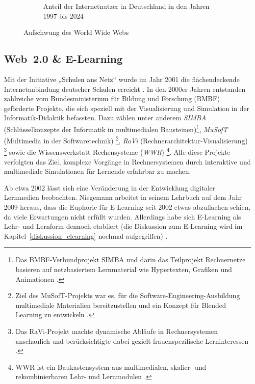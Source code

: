 \begin{figure}[h!]
\begin{subfigure}[b]{0.48\textwidth}
        \caption{Anteil der Internetnutzer in Deutschland in den Jahren 1997 bis 2024}
        \label{fig:internetnutzer}
		\cite{statista_anteil_2024}
    \end{subfigure}
    \caption{Aufschwung des World Wide Webs}
    \label{fig:www}
\end{figure}

\subsection{Web~2.0 \& E-Learning}

Mit der Initiative „Schulen ans Netz“ \cite{schulen_ans_netz_ev_schulen_nodate} wurde im Jahr 2001 die flächendeckende Internetanbindung deutscher Schulen erreicht \cite{kopcke_internet_2016}. In den 2000er Jahren entstanden zahlreiche vom Bundesministerium für Bildung und Forschung (BMBF) geförderte Projekte, die sich speziell mit der Visualisierung und Simulation in der Informatik-Didaktik befassten. Dazu zählen unter anderem \textit{SIMBA} (Schlüsselkonzepte der Informatik in multimedialen Bausteinen)\footnote{Das BMBF-Verbundprojekt SIMBA und darin das Teilprojekt Rechnernetze basieren auf netzbasiertem Lernmaterial wie Hypertexten, Grafiken und Animationen \parencite[S.~75]{magenheim_blended_2003}.}, \textit{MuSofT} (Multimedia in der Softwaretechnik) \footnote{Ziel des MuSofT-Projekts war es, für die Software-Engineering-Ausbildung multimediale Materialien bereitzustellen und ein Konzept für Blended Learning zu entwickeln \parencite[S.~73]{magenheim_blended_2003}.}, \textit{RaVi} (Rechnerarchitektur-Visualisierung) \footnote{Das RaVi-Projekt machte dynamische Abläufe in Rechnersystemen anschaulich und berücksichtigte dabei gezielt frauenspezifische Lerninteressen \parencite[S.~20]{marwedel_interaktive_2003}.} sowie die Wissenswerkstatt Rechensysteme (\textit{WWR}) \footnote{WWR ist ein Baukastensystem aus multimedialen, skalier- und rekombinierbaren Lehr- und Lernmodulen \parencite[S.~1]{kornelsen_inhalte_2004}.}. Alle diese Projekte verfolgten das Ziel, komplexe Vorgänge in Rechnersystemen durch interaktive und multimediale Simulationen für Lernende erfahrbar zu machen.

Ab etwa 2002 lässt sich eine Veränderung in der Entwicklung digitaler Lernmedien beobachten. Niegemann arbeitet in seinem Lehrbuch auf dem Jahr 2009 heraus, dass die Euphorie für E-Learning seit 2002 etwas abzuflachen schien, da viele Erwartungen nicht erfüllt wurden. Allerdings habe sich E-Learning als Lehr- und Lernform dennoch etabliert (die Diskussion zum E-Learning wird im Kapitel~\ref{diskussion_elearning} nochmal aufgegriffen) \parencite[S.~14]{niegemann_kompendium_2008}.

